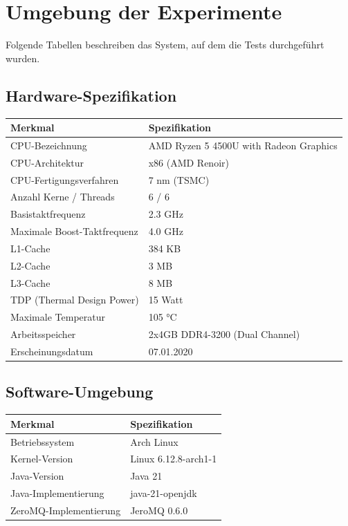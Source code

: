 \documentclass[12pt]{article}
\date{}
\begin{document}
	
\section*{Umgebung der Experimente}
Folgende Tabellen beschreiben das System, auf dem die Tests durchgeführt wurden.
\subsection*{Hardware-Spezifikation}
\begin{table}[h]
	\centering
	\begin{tabular}{|l|l|}
		\hline
		\textbf{Merkmal} & \textbf{Spezifikation} \\
		\hline
		CPU-Bezeichnung & AMD Ryzen 5 4500U with Radeon Graphics\\
		CPU-Architektur & x86 (AMD Renoir) \\
		CPU-Fertigungsverfahren & 7 nm (TSMC) \\
		\hline
		Anzahl Kerne / Threads & 6 / 6 \\
		Basistaktfrequenz & 2.3 GHz \\
		Maximale Boost-Taktfrequenz & 4.0 GHz \\
		\hline
		L1-Cache & 384 KB \\
		L2-Cache & 3 MB \\
		L3-Cache & 8 MB \\
		\hline
		TDP (Thermal Design Power) & 15 Watt \\
		Maximale Temperatur & 105 °C \\
		\hline
		Arbeitsspeicher & 2x4GB DDR4-3200 (Dual Channel) \\
		\hline
		Erscheinungsdatum & 07.01.2020 \\
		\hline
	\end{tabular}
\end{table}

\subsection*{Software-Umgebung}
\begin{table}[h]
	\centering
	\begin{tabular}{|l|l|}
		\hline
		\textbf{Merkmal} & \textbf{Spezifikation} \\
		\hline
		Betriebssystem & Arch Linux\\
		Kernel-Version & Linux 6.12.8-arch1-1\\
		\hline
		Java-Version & Java 21\\
		Java-Implementierung & java-21-openjdk\\
		\hline
		ZeroMQ-Implementierung & JeroMQ 0.6.0\\
		\hline
	\end{tabular}
\end{table}
\end{document}
